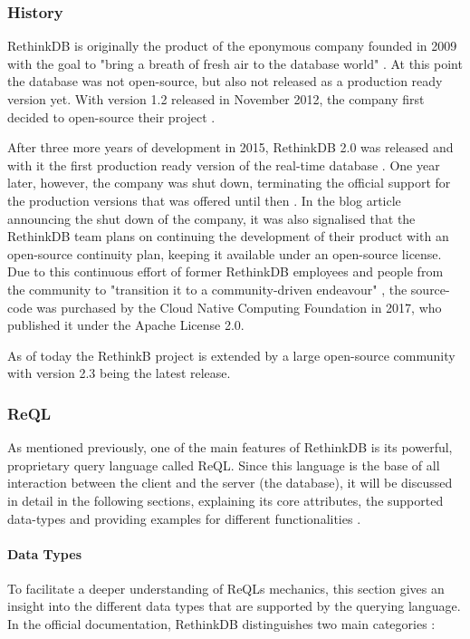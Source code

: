 \subsubsection{History}
RethinkDB is originally the product of the eponymous company founded in 2009 with the goal to "bring a breath of fresh air to the database world" \autocite{rethinkdb:announcement}. At this point the database was not open-source, but also not released as a production ready version yet. With version 1.2 released in November 2012, the company first decided to open-source their project \autocite{rethinkdb:open_source}.


After three more years of development in 2015, RethinkDB 2.0 was released and with it the first production ready version of the real-time database \autocite{rethinkdb:production_ready}. One year later, however, the company was shut down, terminating the official support for the production versions that was offered until then \autocite{rethinkdb:shutting_down}. In the blog article announcing the shut down of the company, it was also signalised that the RethinkDB team plans on continuing the development of their product with an open-source continuity plan, keeping it available under an open-source license. Due to this continuous effort of former RethinkDB employees and people from the community to "transition it to a community-driven endeavour" \autocite{rethinkdb:linux_foundation}, the source-code was purchased by the Cloud Native Computing Foundation in 2017, who published it under the Apache License 2.0.


As of today the RethinkB project is extended by a large open-source community with version 2.3 being the latest release.

\subsubsection{ReQL}
\label{sec:rethink_reql}

As mentioned previously, one of the main features of RethinkDB is its powerful, proprietary query language called ReQL.
Since this language is the base of all interaction between the client and the server (the database), it will be discussed in detail in the following sections, explaining its core attributes, the supported data-types and providing examples for different functionalities \autocite{rethinkdb_reql}.

\paragraph{Data Types}
To facilitate a deeper understanding of ReQLs mechanics, this section gives an insight into the different data types that are supported by the querying language.
In the official documentation, RethinkDB distinguishes two main categories \autocite{rethinkdb:data_types}:

